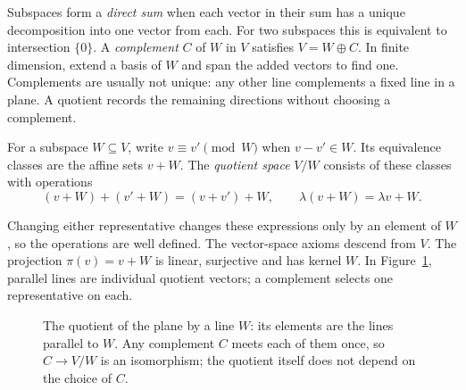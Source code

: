Subspaces form a \emph{direct sum} when each vector in their sum has a unique decomposition into one vector from each. For two subspaces this is equivalent to intersection $\{0\}$. A \emph{complement} $C$ of $W$ in $V$ satisfies $V=W\oplus C$. In finite dimension, extend a basis of $W$ and span the added vectors to find one. Complements are usually not unique: any other line complements a fixed line in a plane. A quotient records the remaining directions without choosing a complement.

\begin{definition}\label{linear:def:quotient}
For a subspace $W\subseteq V$, write $v\equiv v'\pmod W$ when $v-v'\in W$. Its equivalence classes are the affine sets $v+W$. The \emph{quotient space} $V/W$ consists of these classes with operations
\[(v+W)+(v'+W)=(v+v')+W,\qquad\lambda(v+W)=\lambda v+W.\]
\end{definition}

Changing either representative changes these expressions only by an element of $W$, so the operations are well defined. The vector-space axioms descend from $V$. The projection $\pi(v)=v+W$ is linear, surjective and has kernel $W$. In Figure~\ref{linear:fig:quotient}, parallel lines are individual quotient vectors; a complement selects one representative on each.
\begin{figure}[ht]
\centering
{}
\caption{The quotient of the plane by a line $W$: its elements are the lines parallel to $W$. Any complement $C$ meets
each of them once, so $C\to V/W$ is an isomorphism; the quotient itself does not depend on the choice of $C$.}
\label{linear:fig:quotient}
\end{figure}

